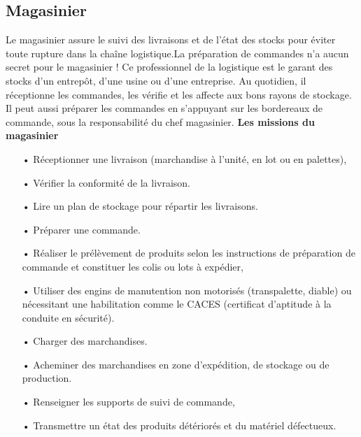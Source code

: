 \documentclass[edit,12pt,a4paper,ChapStyle,oneside,doubleinterligne]{report}
\begin{document}
\subsection{Magasinier}
Le magasinier assure le suivi des livraisons et de l’état des stocks pour éviter toute rupture dans la chaîne logistique.La préparation de commandes n’a aucun secret pour le magasinier ! Ce professionnel de la logistique est le garant des stocks d’un entrepôt, d’une usine ou d’une entreprise. Au quotidien, il réceptionne les commandes, les vérifie et les affecte aux bons rayons de stockage. Il peut aussi préparer les commandes en s’appuyant sur les bordereaux de commande, sous la responsabilité du chef magasinier\cite{Magasinier}.
\newline\newline
\textbf{Les missions du magasinier}\newline
\begin{itemize}
    \item [•]Réceptionner une livraison (marchandise à l’unité, en lot ou en palettes),
    \item [•] Vérifier la conformité de la livraison.
    \item [•] Lire un plan de stockage pour répartir les livraisons.
    \item [•] Préparer une commande.
    \item [•] Réaliser le prélèvement de produits selon les instructions de préparation de commande et constituer les colis ou lots à expédier,
    \item [•] Utiliser des engins de manutention non motorisés (transpalette, diable) ou nécessitant une habilitation comme le CACES (certificat d’aptitude à la conduite en sécurité).
    \item [•] Charger des marchandises.
    \item [•] Acheminer des marchandises en zone d'expédition, de stockage ou de production.
    \item [•] Renseigner les supports de suivi de commande,
    \item [•] Transmettre un état des produits détériorés et du matériel défectueux.
\end{itemize}
\end{document}
